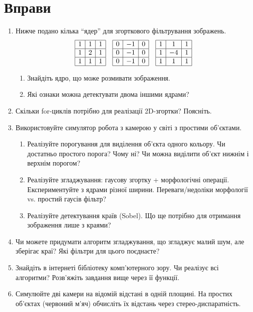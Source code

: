\section*{Вправи}\small
\begin{enumerate}
\item Нижче подано кілька ``ядер'' для згорткового фільтрування зображень.
\begin{equation*}
\begin{array}{|c|c|c|}
\hline
1 & 1 & 1\\
\hline
1 & 2 & 1\\
\hline
1 & 1 & 1\\
\hline
\end{array}
\quad
\begin{array}{|c|c|c|}
\hline
0 & -1 & 0\\
\hline
0 & -1 & 0\\
\hline
0 & -1 & 0\\
\hline
\end{array}
\quad
\begin{array}{|c|c|c|}
\hline
1 & 1 & 1\\
\hline
1 & -4 & 1\\
\hline
1 & 1 & 1\\
\hline
\end{array}
\end{equation*}
\begin{enumerate}
\item Знайдіть ядро, що може розмивати зображення.
\item Які ознаки можна детектувати двома іншими ядрами?
\end{enumerate}
\item Скільки for-циклів потрібно для реалізації 2D-згортки? Поясніть.
\item Використовуйте симулятор робота з камерою у світі з простими об'єктами.
\begin{enumerate}
\item Реалізуйте порогування для виділення об'єкта одного кольору. Чи достатньо простого порога? Чому ні? Чи можна виділити об'єкт нижнім і верхнім порогом?
\item Реалізуйте згладжування: гаусову згортку + морфологічні операції. Експериментуйте з ядрами різної ширини. Переваги/недоліки морфології vs. простий гаусів фільтр?
\item Реалізуйте детектування країв (Sobel). Що ще потрібно для отримання зображення лише з краями?
\end{enumerate}
\item Чи можете придумати алгоритм згладжування, що згладжує малий шум, але зберігає краї? Які фільтри для цього поєднаєте?
\item Знайдіть в інтернеті бібліотеку комп'ютерного зору. Чи реалізує всі алгоритми? Розв'яжіть завдання вище через її функції.
\item Симулюйте дві камери на відомій відстані в одній площині. На простих об'єктах (червоний м'яч) обчисліть їх відстань через стерео-диспаратність.
\end{enumerate} \normalsize
